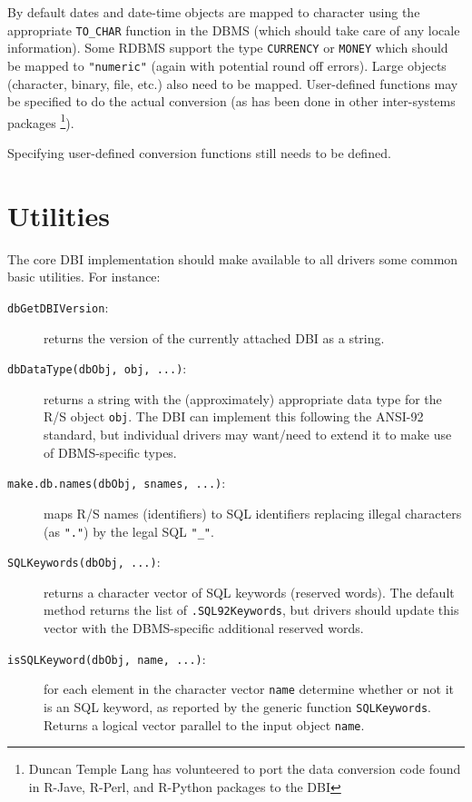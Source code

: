 \documentclass[graphics,times,psfig,dvips,hyper]{article}
\newcommand{\sobj}[1]{\mbox{\tt #1}}    %
\newcommand{\smethod}[1]{\mbox{\tt #1}} %
\begin{document}
By default dates and date-time objects are mapped to character
using the appropriate \texttt{TO\_CHAR} function in the DBMS
(which should take care of any locale information).  Some RDBMS
support the type \texttt{CURRENCY} or \texttt{MONEY} which should be
mapped to \sobj{"numeric"} (again with potential round off errors).
Large objects (character, binary, file, etc.) also need to be mapped.
User-defined functions may be specified to do the actual conversion
(as has been done in other inter-systems packages \footnote{
  Duncan Temple Lang has volunteered to port the data conversion 
  code found in R-Jave, R-Perl, and R-Python packages to the DBI}).

Specifying user-defined conversion functions still needs to be 
defined.

\section{Utilities}\label{sec:utilities}
The core DBI implementation should make available to all
drivers some common basic utilities.  For instance:
\begin{description}
\item[\smethod{dbGetDBIVersion}:]
  returns the version of the currently attached DBI as a string.

\item[\smethod{dbDataType(dbObj, obj, ...)}:]
  returns a string with the (approximately) appropriate data type for
  the R/S object \sobj{obj}.  The DBI can implement this following
  the ANSI-92 standard, but individual drivers may want/need to extend
  it to make use of DBMS-specific types.

\item[\smethod{make.db.names(dbObj, snames, ...)}:]
  maps R/S names (identifiers) to SQL identifiers replacing 
  illegal characters (as \sobj{"."}) by the legal SQL \sobj{"\_"}.

\item[\sobj{SQLKeywords(dbObj, ...)}:]
  returns a character vector of SQL keywords (reserved words).  
  The default method returns the list of \sobj{.SQL92Keywords},
  but drivers should update this vector with the DBMS-specific
  additional reserved words.

\item[\smethod{isSQLKeyword(dbObj, name, ...)}:]
  for each element in the character vector \sobj{name} determine 
  whether or not it is an SQL keyword, as reported by the 
  generic function \smethod{SQLKeywords}.  Returns a logical vector
  parallel to the input object \sobj{name}.

\end{description}
\end{document}
